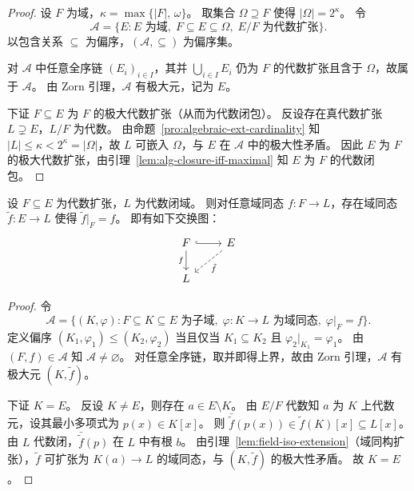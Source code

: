 \documentclass[lang=cn,a4paper,newtx]{elegantbook}
\begin{document}
\begin{proof}
  设 $F$ 为域，$\kappa=\max\{|F|,\,\omega\}$。
  取集合 $\Omega\supseteq F$ 使得 $|\Omega|=2^{\kappa}$。
  令
  \[
    \mathcal{A}=\{E: E\text{ 为域},\;F\subseteq E\subseteq\Omega,\;E/F\text{ 为代数扩张}\}.
  \]
  以包含关系 $\subseteq$ 为偏序，$(\mathcal{A},\subseteq)$ 为偏序集。

  对 $\mathcal{A}$ 中任意全序链 $(E_i)_{i\in I}$，其并 $\bigcup_{i\in I}E_i$ 仍为 $F$ 的代数扩张且含于 $\Omega$，故属于 $\mathcal{A}$。
  由 Zorn 引理，$\mathcal{A}$ 有极大元，记为 $E$。

  下证 $F\subseteq E$ 为 $F$ 的极大代数扩张（从而为代数闭包）。
  反设存在真代数扩张 $L\supsetneq E$，$L/F$ 为代数。
  由命题~\ref{pro:algebraic-ext-cardinality} 知 $|L|\le\kappa<2^{\kappa}=|\Omega|$，故 $L$ 可嵌入 $\Omega$，与 $E$ 在 $\mathcal{A}$ 中的极大性矛盾。
  因此 $E$ 为 $F$ 的极大代数扩张，由引理~\ref{lem:alg-closure-iff-maximal} 知 $E$ 为 $F$ 的代数闭包。
\end{proof}

\begin{lemma}\label{extend-hom-to-algebraic}
  设 $F\subseteq E$ 为代数扩张，$L$ 为代数闭域。
  则对任意域同态 $f\colon F\to L$，存在域同态 $\tilde f\colon E\to L$ 使得 $\tilde f\big|_F=f$。
  即有如下交换图：
  \[
    \begin{tikzcd}
      F \arrow[r,hook] \arrow[d,"f"'] & E \arrow[dl,dashed,"\tilde f"] \\
      L
    \end{tikzcd}
  \]
\end{lemma}

\begin{proof}
  令
  \[
    \mathcal{A}=\bigl\{(K,\varphi): F\subseteq K\subseteq E\text{ 为子域},\;\varphi\colon K\to L\text{ 为域同态},\;\varphi\big|_F=f\bigr\}.
  \]
  定义偏序 $(K_1,\varphi_1)\le(K_2,\varphi_2)$ 当且仅当 $K_1\subseteq K_2$ 且 $\varphi_2\big|_{K_1}=\varphi_1$。
  由 $(F,f)\in\mathcal{A}$ 知 $\mathcal{A}\ne\varnothing$。
  对任意全序链，取并即得上界，故由 Zorn 引理，$\mathcal{A}$ 有极大元 $(K,\tilde f)$。

  下证 $K=E$。
  反设 $K\ne E$，则存在 $a\in E\setminus K$。
  由 $E/F$ 代数知 $a$ 为 $K$ 上代数元，设其最小多项式为 $p(x)\in K[x]$。
  则 $\bar{\tilde f}(p(x))\in\tilde f(K)[x]\subseteq L[x]$。
  由 $L$ 代数闭，$\bar{\tilde f}(p)$ 在 $L$ 中有根 $b$。
  由引理~\ref{lem:field-iso-extension}（域同构扩张），$\tilde f$ 可扩张为 $K(a)\to L$ 的域同态，与 $(K,\tilde f)$ 的极大性矛盾。
  故 $K=E$。
\end{proof}
\end{document}
